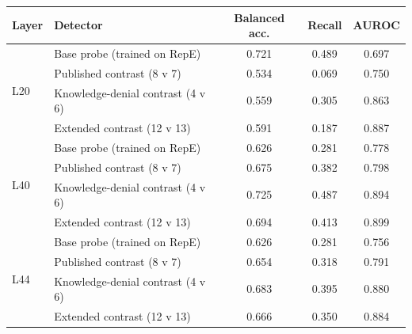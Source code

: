 \begin{tabular}{llccc}
\toprule
Layer & Detector & Balanced acc. & Recall & AUROC \\
\midrule
\multirow{4}{*}{L20} & Base probe (trained on RepE) & 0.721 & 0.489 & 0.697 \\
 & Published contrast (8 v 7) & 0.534 & 0.069 & 0.750 \\
 & Knowledge-denial contrast (4 v 6) & 0.559 & 0.305 & 0.863 \\
 & Extended contrast (12 v 13) & 0.591 & 0.187 & 0.887 \\
\midrule
\multirow{4}{*}{L40} & Base probe (trained on RepE) & 0.626 & 0.281 & 0.778 \\
 & Published contrast (8 v 7) & 0.675 & 0.382 & 0.798 \\
 & Knowledge-denial contrast (4 v 6) & 0.725 & 0.487 & 0.894 \\
 & Extended contrast (12 v 13) & 0.694 & 0.413 & 0.899 \\
\midrule
\multirow{4}{*}{L44} & Base probe (trained on RepE) & 0.626 & 0.281 & 0.756 \\
 & Published contrast (8 v 7) & 0.654 & 0.318 & 0.791 \\
 & Knowledge-denial contrast (4 v 6) & 0.683 & 0.395 & 0.880 \\
 & Extended contrast (12 v 13) & 0.666 & 0.350 & 0.884 \\
\bottomrule
\end{tabular}